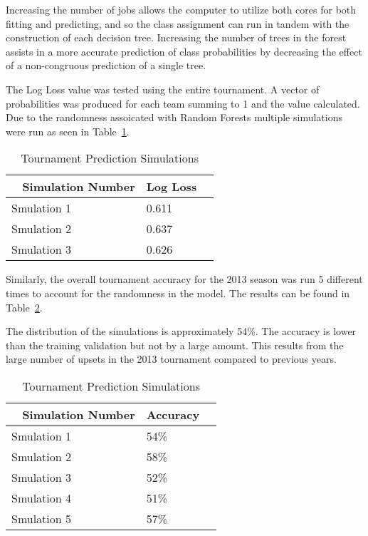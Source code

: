\documentclass[conference]{IEEEtran}
\begin{document}
Increasing the number of jobs allows the computer to utilize both cores for both fitting and predicting, and so the class assignment can run in tandem with the construction of each decision tree. Increasing the number of trees in the forest assists in a more accurate prediction of class probabilities by decreasing the effect of a non-congruous prediction of a single tree.

The Log Loss value was tested using the entire tournament. A vector of probabilities was produced for each team summing to 1 and the value calculated. Due to the randomness assoicated with Random Forests multiple simulations were run as seen in Table~\ref{tab:ll_table}.

\begin{table}[H]
	\centering
    \begin{tabular}{|l|l|l|}
    \hline
    ~   \textbf{Simulation Number}  & \textbf{Log Loss} \\ \hline
    Smulation 1 & 0.611  \\ \hline
    Smulation 2 & 0.637\\ \hline
    Smulation 3 &  0.626\\ \hline
    \end{tabular}
    \caption {Tournament Prediction Simulations}
    \label{tab:ll_table}
\end{table}

Similarly, the overall tournament accuracy for the 2013 season was run 5 different times to account for the randomness in the model. The results can be found in Table~\ref{tab:thetable}.

The distribution of the simulations is approximately 54\%. The accuracy is lower than the training validation but not by a large amount. This results from the large number of upsets in the 2013 tournament compared to previous years. 
 
\begin{table}[H]
	\centering
    \begin{tabular}{|l|l|l|}
    \hline
    ~   \textbf{Simulation Number}  & \textbf{Accuracy} \\ \hline
    Smulation 1 & 54\%  \\ \hline
    Smulation 2 & 58\% \\ \hline
    Smulation 3 & 52\% \\ \hline
    Smulation 4 & 51\% \\ \hline
    Smulation 5 & 57\%\\ \hline
    \end{tabular}
    \caption {Tournament Prediction Simulations}
    \label{tab:thetable}
\end{table}
\end{document}
